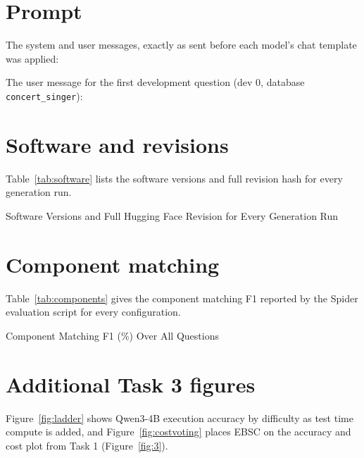 \section{Prompt}
\label{app:prompt}
The system and user messages, exactly as sent before each model's chat template was applied:


The user message for the first development question (dev 0, database \texttt{concert\_singer}):


\section{Software and revisions}
\label{app:software}
Table~\ref{tab:software} lists the software versions and full revision hash for every generation run.
\begin{table}[!htbp]
\centering
\caption{Software Versions and Full Hugging Face Revision for Every Generation Run}
\label{tab:software}
\scriptsize
\setlength{\tabcolsep}{3pt}
\begin{adjustbox}{max width=\linewidth}

\end{adjustbox}
\par{}
\end{table}

\section{Component matching}
\label{app:components}
Table~\ref{tab:components} gives the component matching F1 reported by the Spider evaluation script for every configuration.
\begin{table}[!htbp]
\centering
\caption{Component Matching F1 (\%) Over All Questions}
\label{tab:components}
\scriptsize
\setlength{\tabcolsep}{3pt}
\begin{adjustbox}{max width=\linewidth}

\end{adjustbox}
\end{table}

\FloatBarrier
\section{Additional Task 3 figures}
\label{app:task3figures}
Figure~\ref{fig:ladder} shows Qwen3-4B execution accuracy by difficulty as test time compute is added, and Figure~\ref{fig:costvoting} places EBSC on the accuracy and cost plot from Task 1 (Figure~\ref{fig:3}).

